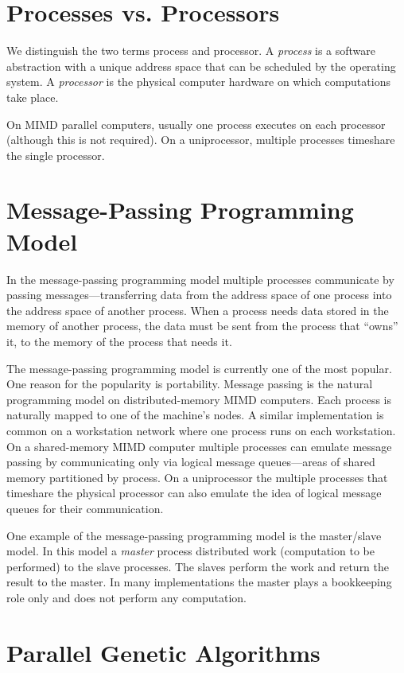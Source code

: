 \documentclass{report}
\begin{document}
\section*{Processes vs. Processors}

We distinguish the  two terms process and processor.  A {\em process} is a
software abstraction with a unique address space that can be scheduled by the
operating system.  A {\em processor} is the physical computer hardware on
which computations take place. 

On MIMD parallel computers, usually one process executes on
each processor (although this is not required).  On a uniprocessor,
multiple processes timeshare the single processor.


\section*{Message-Passing Programming Model}

In the message-passing programming model multiple processes communicate by
passing messages---trans\-ferring data from the address space of one process
into the address space of another process.  When a process needs data stored
in the memory of another process, the data must be sent from the process that
``owns'' it, to the memory of the process that needs it.

The message-passing programming model is currently one of the most popular.
One reason for the popularity is portability. Message passing is the natural
programming model on distributed-memory MIMD computers.  Each process is
naturally mapped to one of the machine's nodes.  A similar implementation is
common on a workstation network where one process runs on each workstation.
On a shared-memory MIMD computer multiple processes can emulate
message passing by communicating only via logical message queues---areas of
shared memory partitioned by process. On a uniprocessor the multiple processes
that timeshare the physical processor can also emulate the idea of 
logical message queues for their communication.

One example of the message-passing programming model is the master/slave
model.  In this model a {\em master} process distributed work (computation to
be performed) to the slave processes.  The slaves perform the work and return
the result to the master.  In many implementations the master plays a
bookkeeping role only and does not perform any computation.


\section*{Parallel Genetic Algorithms}
\end{document}

